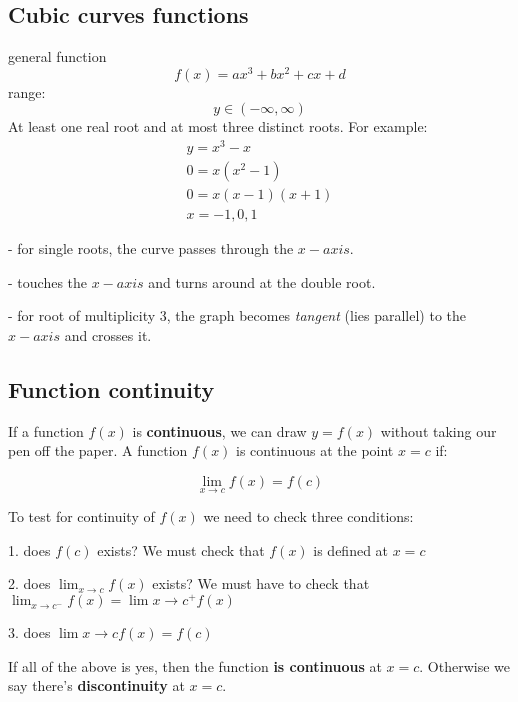\documentclass{article}
\begin{document}
\subsection{Cubic curves functions}
general function
\begin{equation}
  f(x) = ax^3 + bx^2 + cx + d
\end{equation}
range:
\begin{equation}
  y \in (-\infty, \infty)
\end{equation}
At least one real root and at most three distinct roots. For example:
\begin{equation}
  \begin{gathered}
    y = x^3 - x \\
    0 = x(x^2 - 1) \\
    0 = x(x - 1)(x + 1) \\
    x = -1, 0, 1
  \end{gathered}
\end{equation}

- for single roots, the curve passes through the $x-axis$.

- touches the $x-axis$ and turns around at the double root.

- for root of multiplicity 3, the graph becomes \textit{tangent} (lies parallel) to the $x-axis$ and crosses it.

\subsection{Function continuity}
If a function $f(x)$ is \textbf{continuous}, we can draw $y = f(x)$ without
taking our pen off the paper. A function $f(x)$ is continuous at the point
$x = c$ if:

\begin{equation}
  \lim_{x \to c}f(x) = f(c)
\end{equation}

To test for continuity of $f(x)$ we need to check three conditions:

1. does $f(c)$ exists?
We must check that $f(x)$ is defined at $x=c$

2. does $\lim_{x \to c}f(x)$ exists?
We must have to check that $\lim_{x \to c^-}f(x) = \lim{x \to c^+}f(x)$

3. does $\lim{x \to c}f(x) = f(c)$

If all of the above is yes, then the function \textbf{is continuous} at $x = c$.
Otherwise we say there's \textbf{discontinuity} at $x = c$.
\end{document}
